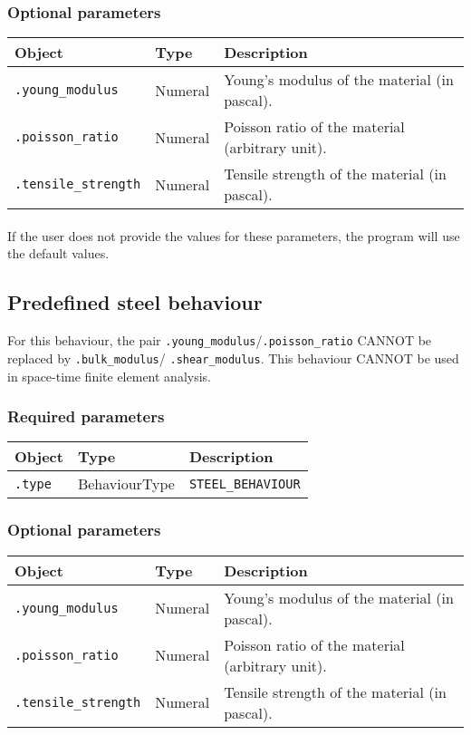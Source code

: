 \documentclass[10pt]{article}
\begin{document}
\subsubsection*{Optional parameters}

\begin{tabularx}{\textwidth}{llX}
\hline 
Object & Type & Description \\ 
\hline 
\verb+.young_modulus+ & Numeral & Young's modulus of the material (in pascal). \\ 
\verb+.poisson_ratio+ & Numeral & Poisson ratio of the material (arbitrary unit). \\ 
\verb+.tensile_strength+ & Numeral & Tensile strength of the material (in pascal). \\ 
\hline 
\end{tabularx}

\paragraph{} If the user does not provide the values for these parameters, the program will use the default values.

\subsection{Predefined steel behaviour}

For this behaviour, the pair \verb+.young_modulus+/\verb+.poisson_ratio+ CANNOT be replaced by \verb+.bulk_modulus+/ \verb+.shear_modulus+. This behaviour CANNOT be used in space-time finite element analysis.

\subsubsection*{Required parameters}

\begin{tabularx}{\textwidth}{llX}
\hline 
Object & Type & Description \\ 
\hline 
\verb+.type+ & BehaviourType & \verb+STEEL_BEHAVIOUR+ \\ 
\hline 
\end{tabularx}

\subsubsection*{Optional parameters}

\begin{tabularx}{\textwidth}{llX}
\hline 
Object & Type & Description \\ 
\hline 
\verb+.young_modulus+ & Numeral & Young's modulus of the material (in pascal). \\ 
\verb+.poisson_ratio+ & Numeral & Poisson ratio of the material (arbitrary unit). \\ 
\verb+.tensile_strength+ & Numeral & Tensile strength of the material (in pascal). \\ 
\hline 
\end{tabularx}
\end{document}

